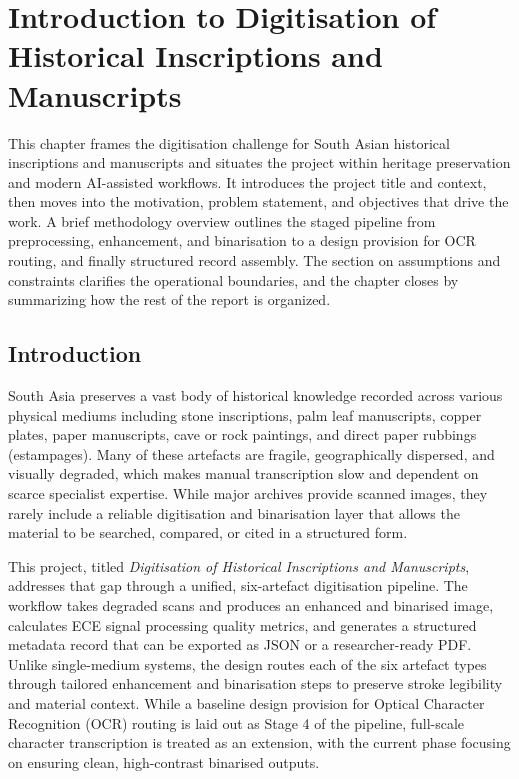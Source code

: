 \chapter{Introduction to Digitisation of Historical Inscriptions and Manuscripts}
This chapter frames the digitisation challenge for South Asian historical inscriptions and manuscripts and situates the project within heritage preservation and modern AI-assisted workflows. It introduces the project title and context, then moves into the motivation, problem statement, and objectives that drive the work. A brief methodology overview outlines the staged pipeline from preprocessing, enhancement, and binarisation to a design provision for OCR routing, and finally structured record assembly. The section on assumptions and constraints clarifies the operational boundaries, and the chapter closes by summarizing how the rest of the report is organized.

\section[Introduction]{Introduction}
South Asia preserves a vast body of historical knowledge recorded across various physical mediums including stone inscriptions, palm leaf manuscripts, copper plates, paper manuscripts, cave or rock paintings, and direct paper rubbings (estampages). Many of these artefacts are fragile, geographically dispersed, and visually degraded, which makes manual transcription slow and dependent on scarce specialist expertise. While major archives provide scanned images, they rarely include a reliable digitisation and binarisation layer that allows the material to be searched, compared, or cited in a structured form.

This project, titled \textit{Digitisation of Historical Inscriptions and Manuscripts}, addresses that gap through a unified, six-artefact digitisation pipeline. The workflow takes degraded scans and produces an enhanced and binarised image, calculates ECE signal processing quality metrics, and generates a structured metadata record that can be exported as JSON or a researcher-ready PDF. Unlike single-medium systems, the design routes each of the six artefact types through tailored enhancement and binarisation steps to preserve stroke legibility and material context. While a baseline design provision for Optical Character Recognition (OCR) routing is laid out as Stage 4 of the pipeline, full-scale character transcription is treated as an extension, with the current phase focusing on ensuring clean, high-contrast binarised outputs.

